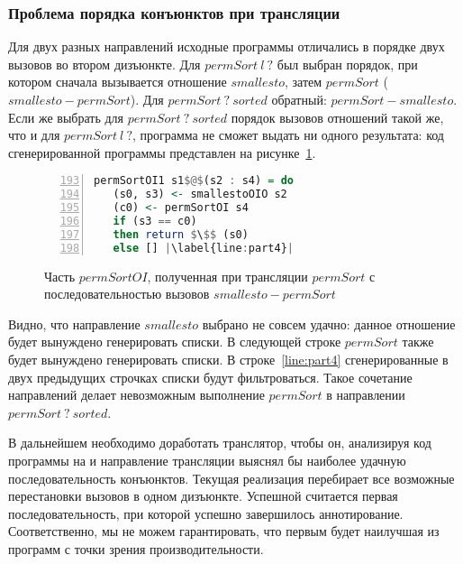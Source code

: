 \subsubsection{Проблема порядка конъюнктов при трансляции}
\label{lab:sortProblem}

Для двух разных направлений исходные программы отличались в порядке двух вызовов во втором дизъюнкте.
Для $permSort \ l \ ?$ был выбран порядок, при котором сначала вызывается отношение $smallesto$, затем $permSort$ ($smallesto-permSort$).
Для $permSort \ ? \ sorted$ обратный: $permSort-smallesto$.
Если же выбрать для $permSort \ ? \ sorted$ порядок вызовов отношений такой же, что и для $permSort \ l \ ?$, программа не сможет выдать ни одного результата: код сгенерированной программы представлен на рисунке~\ref{lst:part}.

\begin{figure}[h!]
  \begin{center}
  \begin{minipage}{0.63\textwidth}
  \begin{lstlisting}[language=Haskell, frame=single, numbers=left,numberstyle=\small, firstnumber=193, escapechar=|]
 permSortOI1 s1$@$(s2 : s4) = do
   (s0, s3) <- smallestoOIO s2
   (c0) <- permSortOI s4
   if (s3 == c0)
   then return $\$$ (s0)
   else [] |\label{line:part4}|
  \end{lstlisting}
  \end{minipage}
  \end{center}
  \caption{Часть $permSortOI$, полученная при трансляции $permSort$ с последовательностью вызовов $smallesto-permSort$}
  \label{lst:part}
\end{figure}

Видно, что направление $smallesto$ выбрано не совсем удачно: данное отношение будет вынуждено генерировать списки.
В следующей строке $permSort$ также будет вынуждено генерировать списки.
В строке~\ref{line:part4} сгенерированные в двух предыдущих строчках списки будут фильтроваться.
Такое сочетание направлений делает невозможным выполнение $permSort$ в направлении $permSort \ ? \ sorted$.

В дальнейшем необходимо доработать транслятор, чтобы он, анализируя код программы на \miniKanren{} и направление трансляции выяснял бы наиболее удачную последовательность конъюнктов.
Текущая реализация перебирает все возможные перестановки вызовов в одном дизъюнкте.
Успешной считается первая последовательность, при которой успешно завершилось аннотирование.
Соответственно, мы не можем гарантировать, что первым будет наилучшая из программ с точки зрения производительности.
